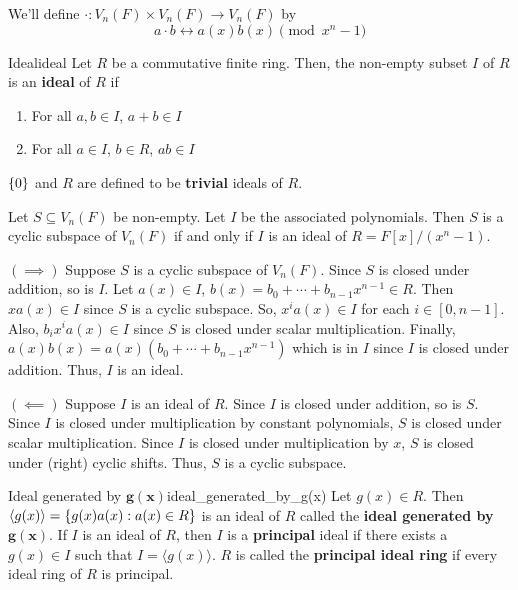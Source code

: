 We'll define $ \cdot : V_n(F)\times V_n(F)\to V_n(F) $
by
\[ a\cdot b \longleftrightarrow a(x)b(x)\pmod{x^n-1} \]

\begin{Definition}{Ideal}{ideal}
    Let $ R $ be a commutative finite ring. Then, the non-empty
    subset $ I $ of $ R $ is an \textbf{ideal} of $ R $ if
    \begin{enumerate}[label=(\arabic*)]
        \item For all $ a,b\in I $, $ a+b\in I $
        \item For all $ a\in I $, $ b\in R $, $ ab\in I $
    \end{enumerate}
    $ \{0\} $ and $ R $ are defined to be \textbf{trivial} ideals of $ R $.
\end{Definition}

\begin{Theorem}{}{}
    Let $ S\subseteq V_n(F) $ be non-empty. Let $ I $ be the associated polynomials.
    Then $ S $ is a cyclic subspace of $ V_n(F) $ if and only if $ I $
    is an ideal of $ R=F[x]/(x^n-1) $.
\end{Theorem}

\begin{Proof}{}{}
$ (\implies) $ Suppose $ S $ is a cyclic subspace of $ V_n(F) $.
Since $ S $ is closed under addition, so is $ I $.
Let $ a(x)\in I $, $ b(x)=b_0+\cdots+b_{n-1}x^{n-1}\in R $.
Then $ xa(x)\in I $ since $ S $ is a cyclic subspace. So,
$ x^i a(x)\in I $ for each $ i\in [0,n-1] $. Also,
$ b_i x^i a(x)\in I $ since $ S $ is closed under scalar multiplication.
Finally, $ a(x)b(x)=a(x)(b_0+\cdots+b_{n-1}x^{n-1}) $ which is in $ I $
since $ I $ is closed under addition. Thus, $ I $ is an ideal.

$ (\impliedby) $ Suppose $ I $ is an ideal of $ R $. Since $ I $
is closed under addition, so is $ S $. Since $ I $ is closed
under multiplication by constant polynomials, $ S $ is closed
under scalar multiplication. Since $ I $ is closed under
multiplication by $ x $, $ S $ is closed under (right) cyclic shifts.
Thus, $ S $ is a cyclic subspace.
\end{Proof}

\begin{Definition}{Ideal generated by $\symbf{g(x)}$}{ideal_generated_by_g(x)}
    Let $ g(x)\in R $. Then $ \langle g(x) \rangle = \{g(x)a(x):a(x)\in R\} $
    is an ideal of $ R $ called the \textbf{ideal generated by $\symbf{g(x)}$}.
    If $ I $ is an ideal of $ R $, then $ I $ is a \textbf{principal}
    ideal if there exists a $ g(x)\in I $ such that $ I= \langle g(x) \rangle $.
    $ R $ is called the \textbf{principal ideal ring} if every ideal
    ring of $ R $ is principal.
\end{Definition}

